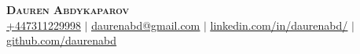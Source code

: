 \documentclass[letterpaper,11pt]{article}
\begin{document}

\begin{center}
\textbf{\Huge \scshape Dauren Abdykaparov} \\ \vspace{1pt}
\href{tel:447311229998}{+447311229998} $|$
\href{mailto:daurenabd@gmail.com}{\underline{daurenabd@gmail.com}} $|$
\href{https://www.linkedin.com/in/daurenabd/}{\underline{linkedin.com/in/daurenabd/}} $|$
\href{https://github.com/daurenabd}{\underline{github.com/daurenabd}}
\end{center}


\end{document}
